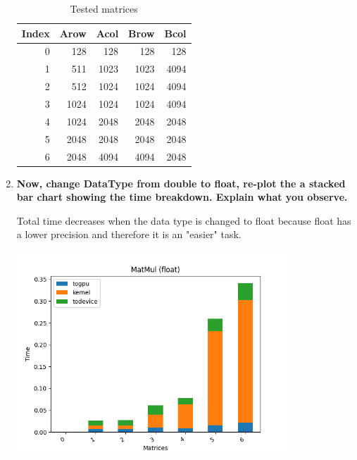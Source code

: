 \documentclass[a4paper,11pt]{scrartcl}
\begin{document}
\begin{enumerate}
\begin{table}
    \centering
    \caption{Tested matrices}
    \begin{tabular}{rrrrr}
    \toprule
     Index & Arow & Acol & Brow & Bcol \\
    \midrule
         0 &  128 &  128 &  128 &  128 \\
         1 &  511 & 1023 & 1023 & 4094 \\
         2 &  512 & 1024 & 1024 & 4094 \\
         3 & 1024 & 1024 & 1024 & 4094 \\
         4 & 1024 & 2048 & 2048 & 2048 \\
         5 & 2048 & 2048 & 2048 & 2048 \\
         6 & 2048 & 4094 & 4094 & 2048 \\
    \bottomrule
    \end{tabular}
    \end{table}


\item \textbf{Now, change DataType from double to float, re-plot the a stacked bar chart showing the time breakdown. Explain what you observe. }

Total time decreases when the data type is changed to float because float has a lower precision and therefore it is an "easier" task.

\includegraphics*[width=0.8\textwidth]{images/ex22.png}

\end{enumerate}
\end{document}
